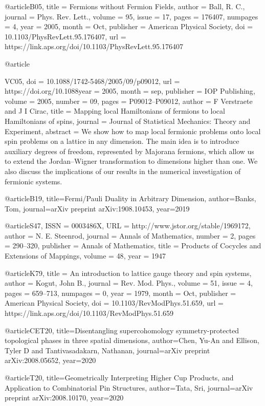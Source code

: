 \documentclass[12pt]{article}
\begin{document}
{@article{B05,
  title = {Fermions without Fermion Fields},
  author = {Ball, R. C.},
  journal = {Phys. Rev. Lett.},
  volume = {95},
  issue = {17},
  pages = {176407},
  numpages = {4},
  year = {2005},
  month = {Oct},
  publisher = {American Physical Society},
  doi = {10.1103/PhysRevLett.95.176407},
  url = {https://link.aps.org/doi/10.1103/PhysRevLett.95.176407}
}

@article{VC05,
	doi = {10.1088/1742-5468/2005/09/p09012},
	url = {https://doi.org/10.1088year = 2005,
	month = {sep},
	publisher = {{IOP} Publishing},
	volume = {2005},
	number = {09},
	pages = {P09012--P09012},
	author = {F Verstraete and J I Cirac},
	title = {Mapping local Hamiltonians of fermions to local Hamiltonians of spins},
	journal = {Journal of Statistical Mechanics: Theory and Experiment},
	abstract = {We show how to map local fermionic problems onto local spin problems on a lattice in any
dimension. The main idea is to introduce auxiliary degrees of freedom, represented by
Majorana fermions, which allow us to extend the Jordan–Wigner transformation to
dimensions higher than one. We also discuss the implications of our results in the numerical
investigation of fermionic systems.}
}

@article{B19,
  title={Fermi/Pauli Duality in Arbitrary Dimension},
  author={Banks, Tom},
  journal={arXiv preprint arXiv:1908.10453},
  year={2019}
}

@article{S47,
 ISSN = {0003486X},
 URL = {http://www.jstor.org/stable/1969172},
 author = {N. E. Steenrod},
 journal = {Annals of Mathematics},
 number = {2},
 pages = {290--320},
 publisher = {Annals of Mathematics},
 title = {Products of Cocycles and Extensions of Mappings},
 volume = {48},
 year = {1947}
}

@article{K79,
  title = {An introduction to lattice gauge theory and spin systems},
  author = {Kogut, John B.},
  journal = {Rev. Mod. Phys.},
  volume = {51},
  issue = {4},
  pages = {659--713},
  numpages = {0},
  year = {1979},
  month = {Oct},
  publisher = {American Physical Society},
  doi = {10.1103/RevModPhys.51.659},
  url = {https://link.aps.org/doi/10.1103/RevModPhys.51.659}
}

@article{CET20,
  title={Disentangling supercohomology symmetry-protected topological phases in three spatial dimensions},
  author={Chen, Yu-An and Ellison, Tyler D and Tantivasadakarn, Nathanan},
  journal={arXiv preprint arXiv:2008.05652},
  year={2020}
}

@article{T20,
  title={Geometrically Interpreting Higher Cup Products, and Application to Combinatorial Pin Structures},
  author={Tata, Sri},
  journal={arXiv preprint arXiv:2008.10170},
  year={2020}
}

}}
\end{document}
